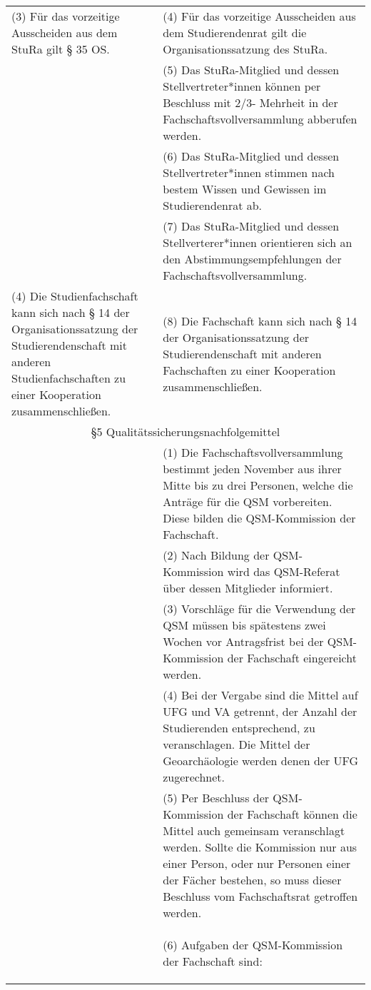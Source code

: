 {\begin{longtable}{|p{7.5cm}|p{7.5cm}|}
        (3)  Für das vorzeitige Ausscheiden aus dem StuRa gilt § 35 OS. & (4)  Für das vorzeitige Ausscheiden aus dem Studierendenrat gilt die
        Organisationssatzung des StuRa. \\
        &(5) Das StuRa-Mitglied und dessen Stellvertreter*innen können per Beschluss mit 2/3-
        Mehrheit in der Fachschaftsvollversammlung abberufen werden. \\
        &(6) Das StuRa-Mitglied und dessen Stellvertreter*innen stimmen nach bestem Wissen und
        Gewissen im Studierendenrat ab. \\
        &(7) Das StuRa-Mitglied und dessen Stellverterer*innen orientieren sich an den
        Abstimmungsempfehlungen der Fachschaftsvollversammlung. \\
        (4)  Die Studienfachschaft kann sich nach § 14 der Organisationssatzung der
        Studierendenschaft mit anderen Studienfachschaften zu einer Kooperation
        zusammenschließen.&
        (8)  Die Fachschaft kann sich nach § 14 der Organisationssatzung der
        Studierendenschaft mit anderen Fachschaften zu einer Kooperation zusammenschließen.\\
        \multicolumn{2}{|c|}{§5 Qualitätssicherungsnachfolgemittel}\\\hline
        &(1) Die Fachschaftsvollversammlung bestimmt jeden November aus ihrer Mitte bis zu
        drei Personen, welche die Anträge für die QSM vorbereiten. Diese bilden die
        QSM-Kommission der Fachschaft.\\
        &(2) Nach Bildung der QSM-Kommission wird das QSM-Referat über dessen Mitglieder
        informiert. \\
        &(3) Vorschläge für die Verwendung der QSM müssen bis spätestens zwei Wochen vor
        Antragsfrist bei der QSM-Kommission der Fachschaft eingereicht werden.\\
        &(4) Bei der Vergabe sind die Mittel auf UFG und VA getrennt, der Anzahl der
        Studierenden entsprechend, zu veranschlagen. Die Mittel der Geoarchäologie werden
        denen der UFG zugerechnet. \\
        &(5) Per Beschluss der QSM-Kommission der Fachschaft können die Mittel auch gemeinsam
        veranschlagt werden. Sollte die Kommission nur aus einer Person, oder nur Personen
        einer der Fächer bestehen, so muss dieser Beschluss vom Fachschaftsrat getroffen
        werden. \\
        &(6) Aufgaben der QSM-Kommission der Fachschaft sind: 
        \begin{itemize}

\end{itemize}
\end{longtable}}
